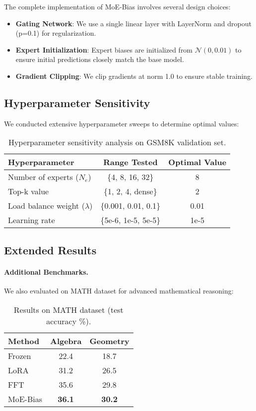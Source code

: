 \documentclass{article}
\begin{document}
The complete implementation of MoE-Bias involves several design choices:

\begin{itemize}
    \item \textbf{Gating Network}: We use a single linear layer with LayerNorm and dropout (p=0.1) for regularization.
    \item \textbf{Expert Initialization}: Expert biases are initialized from $\mathcal{N}(0, 0.01)$ to ensure initial predictions closely match the base model.
    \item \textbf{Gradient Clipping}: We clip gradients at norm 1.0 to ensure stable training.
\end{itemize}

\subsection{Hyperparameter Sensitivity}

We conducted extensive hyperparameter sweeps to determine optimal values:

\begin{table}[h]
\centering
\caption{Hyperparameter sensitivity analysis on GSM8K validation set.}
\begin{tabular}{lcc}
\toprule
Hyperparameter & Range Tested & Optimal Value \\
\midrule
Number of experts ($N_e$) & \{4, 8, 16, 32\} & 8 \\
Top-k value & \{1, 2, 4, dense\} & 2 \\
Load balance weight ($\lambda$) & \{0.001, 0.01, 0.1\} & 0.01 \\
Learning rate & \{5e-6, 1e-5, 5e-5\} & 1e-5 \\
\bottomrule
\end{tabular}
\end{table}

\subsection{Extended Results}

\paragraph{Additional Benchmarks.}
We also evaluated on MATH dataset for advanced mathematical reasoning:

\begin{table}[h]
\centering
\caption{Results on MATH dataset (test accuracy \%).}
\begin{tabular}{lcc}
\toprule
Method & Algebra & Geometry \\
\midrule
Frozen & 22.4 & 18.7 \\
LoRA & 31.2 & 26.5 \\
FFT & 35.6 & 29.8 \\
MoE-Bias & \textbf{36.1} & \textbf{30.2} \\
\bottomrule
\end{tabular}
\end{table}
\end{document}

